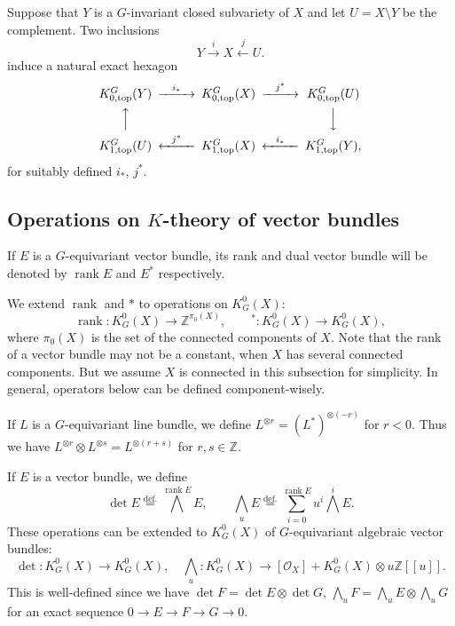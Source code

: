 \documentclass[12pt]{amsart}
\def\Bbb{\mathbb}
\theoremstyle{definition}
\theoremstyle{remark}
\numberwithin{equation}{subsection}
\newcommand{\defeq}{\overset{\operatorname{\scriptstyle def.}}{=}}
\newcommand{\Z}{{\Bbb Z}}
\newcommand{\rank}{\operatorname{rank}}
\newcommand{\shfO}{\mathcal O}
\newcommand{\Wedge}{{\textstyle \bigwedge}}
\newcommand{\Kztop}{K_{0,\operatorname{top}}}
\newcommand{\Kotop}{K_{1,\operatorname{top}}}
\begin{document}
Suppose that $Y$ is a $G$-invariant closed subvariety of $X$ and let
$U = X\setminus Y$ be the complement. Two inclusions
\begin{equation*}
   Y \xrightarrow{i} X \xleftarrow{j} U.
\end{equation*}
induce a natural exact hexagon
\begin{equation}\label{eq:exact'}
\begin{CD}
   \Kztop^G(Y)  @>{i_*}>> \Kztop^G(X)  @>{j^*}>> \Kztop^G(U) \\
     @AAA                 @.                       @VVV      \\
   \Kotop^G(U)  @<{j^*}<< \Kotop^G(X)  @<{i_*}<< \Kotop^G(Y),
\end{CD}
\end{equation}
for suitably defined $i_*$, $j^*$.

\subsection{Operations on $K$-theory of vector bundles}\label{subsec:opt_vec}

If $E$ is a $G$-equivariant vector bundle, its rank and dual vector
bundle will be denoted by $\rank E$ and $E^*$ respectively.

We extend $\rank$ and $*$ to operations on $K^0_G(X)$:
\begin{equation*}
   \rank\colon K^0_G(X) \to \Z^{\pi_0(X)}, \qquad
   {}^*\colon K^0_G(X) \to K^0_G(X),
\end{equation*}
where $\pi_0(X)$ is the set of the connected components of $X$.  Note
that the rank of a vector bundle may not be a constant, when $X$ has
several connected components. But we assume $X$ is connected in this
subsection for simplicity. In general, operators below can be defined
component-wisely.

If $L$ is a $G$-equivariant line bundle, we define $L^{\otimes r} =
(L^*)^{\otimes(-r)}$ for $r < 0$. Thus we have $L^{\otimes r}\otimes
L^{\otimes s} = L^{\otimes (r+s)}$ for $r,s\in\Z$.

If $E$ is a vector bundle, we define
\begin{equation*}
  \det E \defeq \Wedge^{\rank E} E, \qquad
  \Wedge_u E \defeq 
     \sum_{i=0}^{\rank E} u^i \Wedge^i E.
\end{equation*}
These operations can be extended to $K_G^0(X)$ of $G$-equivariant
algebraic vector bundles:
\begin{equation*}
  \det\colon K_G^0(X)\to K_G^0(X), \quad
  \Wedge_u\colon K_G^0(X)\to [\shfO_X] + K_G^0(X)\otimes u\Z[[u]].
\end{equation*}
%
This is well-defined since we have
$\det F = \det E\otimes \det G$,
$\Wedge_u F = \Wedge_u E \otimes \Wedge_u G$ for an exact sequence
$0 \to E \to F \to G \to 0$.
%
\end{document}
